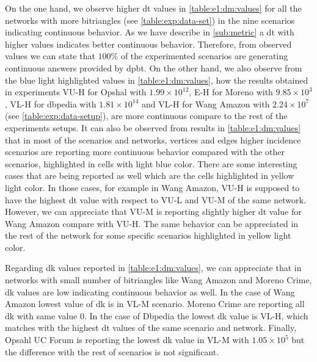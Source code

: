 On the one hand, we observe higher \acrshort{dt} values in \autoref{table:e1:dm:values} for all the networks with more bitriangles (see \autoref{table:exp:data-set}) in the nine scenarios indicating continuous behavior.
As we have describe in \autoref{sub:metric} a \acrshort{dt} with higher values indicates better continuous behavior. Therefore, from observed values we can state that $100\%$ of the experimented scenarios are generating continuous answers provided by \acrshort{dpbt}.
On the other hand, we also observe from the blue light highlighted values in \autoref{table:e1:dm:values}, how the results obtained in experiments VU-H for Opshal with $1.99 \times 10^{12}$, E-H for Moreno with $9.85 \times 10^3$, VL-H for dbpedia with $1.81 \times 10^{14}$ and VL-H for Wang Amazon with $2.24 \times 10^7$ (see \autoref{table:exp:data-setup}), are more continuous compare to the rest of the experiments setups. 
It can also be observed from results in \autoref{table:e1:dm:values} that in most of the scenarios and networks, vertices and edges higher incidence scenarios are reporting more continuous behavior compared with the other scenarios, highlighted in cells with light blue color. 
There are some interesting cases that are being reported as well which are the cells highlighted in yellow light color. In those cases, for example in Wang Amazon, VU-H is supposed to have the highest \acrshort{dt} value with respect to VU-L and VU-M of the same network. However, we can appreciate that VU-M is reporting slightly higher \acrshort{dt} value for Wang Amazon compare with VU-H. 
The same behavior can be appreciated in the rest of the network for some specific scenarios highlighted in yellow light color.

Regarding \acrshort{dk} values reported in \autoref{table:e1:dm:values}, we can appreciate that in networks with small number of bitriangles like Wang Amazon and Moreno Crime, \acrshort{dk} values are low indicating continuous behavior as well.
In the case of Wang Amazon lowest value of \acrshort{dk} is in VL-M scenario. Moreno Crime are reporting all \acrshort{dk} with same value $0$. In the case of Dbpedia the lowest \acrshort{dk} value is VL-H, which matches with the highest \acrshort{dt} values of the same scenario and network.
Finally, Opsahl UC Forum is reporting the lowest \acrshort{dk} value in VL-M with $1.05 \times 10^5$ but the difference with the rest of scenarios is not significant.

